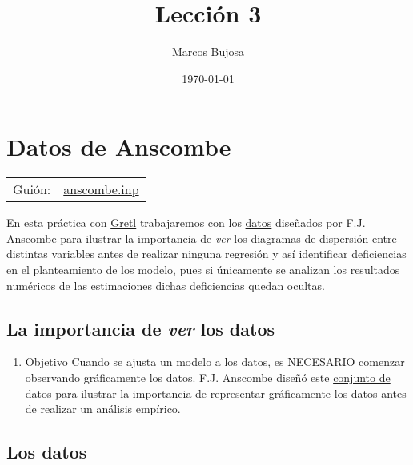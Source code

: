 \documentclass[11pt]{article}
\author{Marcos Bujosa}
\date{\today}
\title{Lección 3}
\begin{document}
\maketitle
\tableofcontents

\clearpage

\section{Datos de Anscombe}
\label{sec:orgcc3c40f}
\begin{center}
\begin{tabular}{ll}
Guión: & \href{https://github.com/mbujosab/Ectr/tree/master/Practicas/Gretl/scripts/anscombe.inp}{anscombe.inp}\\[0pt]
\end{tabular}
\end{center}

En esta práctica con \href{https://gretl.sourceforge.net/es.html}{Gretl} trabajaremos con los \href{http://en.wikipedia.org/wiki/Anscombe's\_quartet}{datos} diseñados por
F.J. Anscombe para ilustrar la importancia de \emph{ver} los diagramas de
dispersión entre distintas variables antes de realizar ninguna
regresión y así identificar deficiencias en el planteamiento de los
modelo, pues si únicamente se analizan los resultados numéricos de las
estimaciones dichas deficiencias quedan ocultas.

\subsection{La importancia de \emph{ver} los datos}
\label{sec:orgca59e93}
\begin{enumerate}
\item Objetivo
\label{sec:orgfde63c1}
Cuando se ajusta un modelo a los datos, es NECESARIO comenzar
observando gráficamente los datos. F.J. Anscombe diseñó este
\href{http://en.wikipedia.org/wiki/Anscombe's\_quartet}{conjunto de datos}
para ilustrar la importancia de representar gráficamente los datos
antes de realizar un análisis empírico.
\end{enumerate}

\subsection{Los datos}
\label{sec:org4d4cad3}
\end{document}

